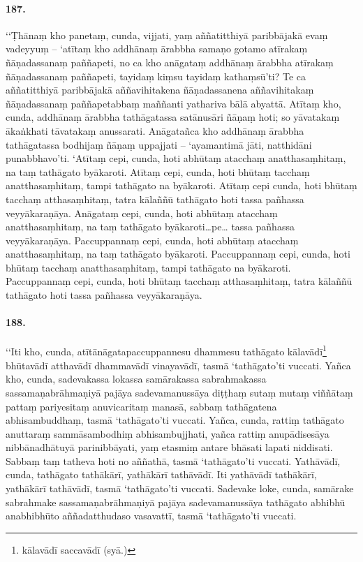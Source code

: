 \paragraph{187.} ‘‘Ṭhānaṃ kho panetaṃ, cunda, vijjati, yaṃ aññatitthiyā paribbājakā evaṃ vadeyyuṃ – ‘atītaṃ kho addhānaṃ ārabbha samaṇo gotamo atīrakaṃ ñāṇadassanaṃ paññapeti, no ca kho anāgataṃ addhānaṃ ārabbha atīrakaṃ ñāṇadassanaṃ paññapeti, tayidaṃ kiṃsu tayidaṃ kathaṃsū’ti? Te ca aññatitthiyā paribbājakā aññavihitakena ñāṇadassanena aññavihitakaṃ ñāṇadassanaṃ paññapetabbaṃ maññanti yathariva bālā abyattā. Atītaṃ kho, cunda, addhānaṃ ārabbha tathāgatassa satānusāri ñāṇaṃ hoti; so yāvatakaṃ ākaṅkhati tāvatakaṃ anussarati. Anāgatañca kho addhānaṃ ārabbha tathāgatassa bodhijaṃ ñāṇaṃ uppajjati – ‘ayamantimā jāti, natthidāni punabbhavo’ti. ‘Atītaṃ cepi, cunda, hoti abhūtaṃ atacchaṃ anatthasaṃhitaṃ, na taṃ tathāgato byākaroti. Atītaṃ cepi, cunda, hoti bhūtaṃ tacchaṃ anatthasaṃhitaṃ, tampi tathāgato na byākaroti. Atītaṃ cepi cunda, hoti bhūtaṃ tacchaṃ atthasaṃhitaṃ, tatra kālaññū tathāgato hoti tassa pañhassa veyyākaraṇāya. Anāgataṃ cepi, cunda, hoti abhūtaṃ atacchaṃ anatthasaṃhitaṃ, na taṃ tathāgato byākaroti…pe… tassa pañhassa veyyākaraṇāya. Paccuppannaṃ cepi, cunda, hoti abhūtaṃ atacchaṃ anatthasaṃhitaṃ, na taṃ tathāgato byākaroti. Paccuppannaṃ cepi, cunda, hoti bhūtaṃ tacchaṃ anatthasaṃhitaṃ, tampi tathāgato na byākaroti. Paccuppannaṃ cepi, cunda, hoti bhūtaṃ tacchaṃ atthasaṃhitaṃ, tatra kālaññū tathāgato hoti tassa pañhassa veyyākaraṇāya.

\paragraph{188.} ‘‘Iti kho, cunda, atītānāgatapaccuppannesu dhammesu tathāgato kālavādī\footnote{kālavādī saccavādī (syā.)} bhūtavādī atthavādī dhammavādī vinayavādī, tasmā ‘tathāgato’ti vuccati. Yañca kho, cunda, sadevakassa lokassa samārakassa sabrahmakassa sassamaṇabrāhmaṇiyā pajāya sadevamanussāya diṭṭhaṃ sutaṃ mutaṃ viññātaṃ pattaṃ pariyesitaṃ anuvicaritaṃ manasā, sabbaṃ tathāgatena abhisambuddhaṃ, tasmā ‘tathāgato’ti vuccati. Yañca, cunda, rattiṃ tathāgato anuttaraṃ sammāsambodhiṃ abhisambujjhati, yañca rattiṃ anupādisesāya nibbānadhātuyā parinibbāyati, yaṃ etasmiṃ antare bhāsati lapati niddisati. Sabbaṃ taṃ tatheva hoti no aññathā, tasmā ‘tathāgato’ti vuccati. Yathāvādī, cunda, tathāgato tathākārī, yathākārī tathāvādī. Iti yathāvādī tathākārī, yathākārī tathāvādī, tasmā ‘tathāgato’ti vuccati. Sadevake loke, cunda, samārake sabrahmake sassamaṇabrāhmaṇiyā pajāya sadevamanussāya tathāgato abhibhū anabhibhūto aññadatthudaso vasavattī, tasmā ‘tathāgato’ti vuccati.

